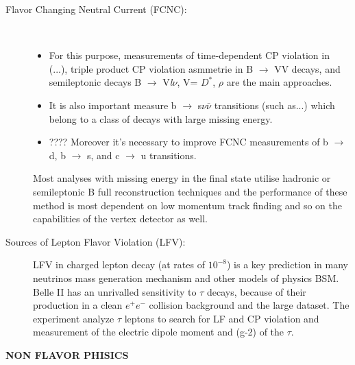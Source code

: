 \begin{description}
\item[Flavor Changing Neutral Current (FCNC):]\
	\begin{itemize}
	\item For this purpose, measurements of time-dependent CP violation in (...), triple product CP violation asmmetrie in B $\rightarrow$ VV decays, and semileptonic decays B $\rightarrow$ V\textit{l}$\nu$, V= $D^{*}$, $\rho$ are the main approaches. 
	\item It is also important measure b $\rightarrow$ s$\nu\bar{\nu}$ transitions (such as...) which belong to a class of decays with large missing energy. 
	\item???? Moreover it's necessary to improve FCNC measurements of b $\rightarrow$ d, b $\rightarrow$ s, and c $\rightarrow$ u transitions. 
	\end{itemize}
	
Most analyses with missing energy in the final state utilise hadronic or semileptonic B full reconstruction techniques and the performance of these method is most dependent on low momentum track finding and so on the capabilities of the vertex detector as well.

\item [Sources of Lepton Flavor Violation (LFV):] LFV in charged lepton decay (at rates of $10^{-8}$) is a key prediction in many neutrinos mass generation mechanism and other models of physics BSM. Belle II has an unrivalled sensitivity to $\tau$ decays, because of their production in a clean $e^{+}e^{-}$ collision background and the large dataset. The experiment analyze $\tau$ leptons to search for LF and CP violation and measurement of the electric dipole moment and (g-2) of the $\tau$.

\end{description}

\hspace{.2cm}

\textbf{NON FLAVOR PHISICS}


